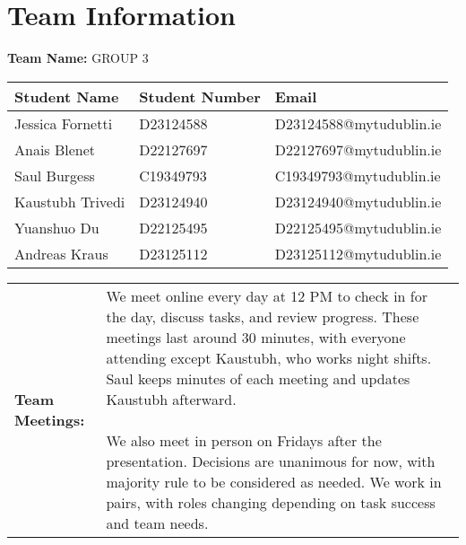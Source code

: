 \documentclass[a4paper,12pt]{article}
\begin{document}
\newpage

\section{Team Information}
\textbf{Team Name:} GROUP 3
\vspace{0.2cm}
\begin{table}[h]
    \centering
    \begin{tabularx}{\textwidth}{@{}p{4cm} p{4cm} p{5cm}@{}}
        \toprule 
        Student Name & Student Number & Email \\ 
        \midrule
        Jessica Fornetti & D23124588 & D23124588@mytudublin.ie \\ 
        Anais Blenet & D22127697 & D22127697@mytudublin.ie \\ 
        Saul Burgess & C19349793 & C19349793@mytudublin.ie \\ 
        Kaustubh Trivedi & D23124940 & D23124940@mytudublin.ie \\ 
        Yuanshuo Du & D22125495 & D22125495@mytudublin.ie \\ 
        Andreas Kraus & D23125112 & D23125112@mytudublin.ie \\ 
        \bottomrule 
    \end{tabularx}
\end{table}

\vspace{0.5cm}

\begin{center}
    \begin{tabular}{|p{}|p{}|}
        \hline
        \textbf{Team Meetings:} & \parbox{0.65\textwidth}
        {\vspace{0.3cm} We meet online every day at 12 PM to check in for the day, discuss tasks, and review progress. These meetings last around 30 minutes, with everyone attending except Kaustubh, who works night shifts. Saul keeps minutes of each meeting and updates Kaustubh afterward. \\ \\ We also meet in person on Fridays after the presentation. Decisions are unanimous for now, with majority rule to be considered as needed. We work in pairs, with roles changing depending on task success and team needs.
        \vspace{0.3cm}} \\ 
        \hline
    \end{tabular}
\end{center}
\end{document}
